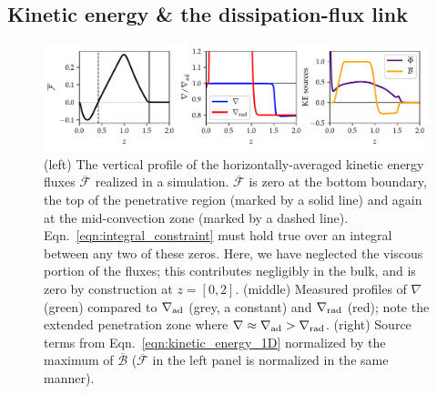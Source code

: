 \documentclass[twocolumn]{aastex631}
\newcommand{\gradrad}{\ensuremath{\nabla_{\rm{rad}}}}
\newcommand{\gradad}{\ensuremath{\nabla_{\rm{ad}}}}
\newcommand{\justgrad}{\ensuremath{\nabla}}
\renewcommand{\bar}[1]{\overline{#1}}
\begin{document}
\subsection{Kinetic energy \& the dissipation-flux link}
\label{sec:theory_energy}
\begin{figure}[t!]
\centering
\includegraphics[width=\textwidth]{theory_profiles.pdf}
\caption{
(left) The vertical profile of the horizontally-averaged kinetic energy fluxes $\bar{\mathcal{F}}$ realized in a simulation. 
$\bar{\mathcal{F}}$ is zero at the bottom boundary, the top of the penetrative region (marked by a solid line) and again at the mid-convection zone (marked by a dashed line).
Eqn.~\ref{eqn:integral_constraint} must hold true over an integral between any two of these zeros.
Here, we have neglected the viscous portion of the fluxes; this contributes negligibly in the bulk, and is zero by construction at $z = [0, 2]$.
(middle) Measured profiles of $\justgrad$ (green) compared to $\gradad$ (grey, a constant) and $\gradrad$ (red); note the extended penetration zone where $\justgrad \approx \gradad > \gradrad$.
(right) Source terms from Eqn.~\ref{eqn:kinetic_energy_1D} normalized by the maximum of $\overline{\mathcal{B}}$ ($\bar{\mathcal{F}}$ in the left panel is normalized in the same manner).
\label{fig:theory_profiles}
}
\end{figure}
\end{document}
